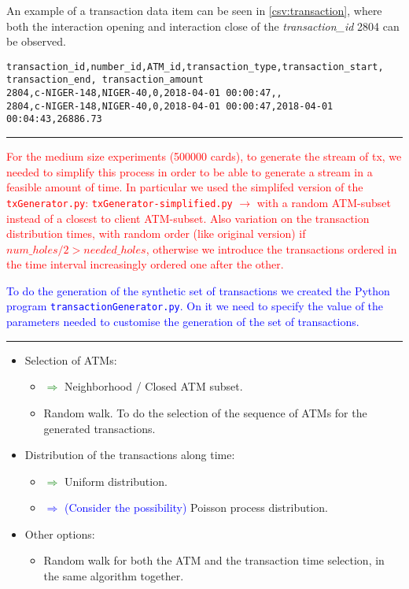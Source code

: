 An example of a transaction data item can be seen in \ref{csv:transaction}, where both the 
interaction opening and interaction close of the \emph{transaction\_id} 2804 can be observed.
\begin{center}
\lstset{style=csvStyle}
\begin{lstlisting}[caption={Example of transaction-all.csv}, label={csv:transaction}]
transaction_id,number_id,ATM_id,transaction_type,transaction_start,
transaction_end, transaction_amount
2804,c-NIGER-148,NIGER-40,0,2018-04-01 00:00:47,,
2804,c-NIGER-148,NIGER-40,0,2018-04-01 00:00:47,2018-04-01 00:04:43,26886.73
\end{lstlisting}
\end{center}

\textcolor{red}{\rule{\linewidth}{0.5mm}}
\textcolor{red}{For the medium size experiments (500000 cards), to generate the stream of tx, we needed to simplify this process in order to be able to generate a stream in a feasible amount of time. In particular we used the simplifed version of the \texttt{txGenerator.py}: \texttt{txGenerator-simplified.py} $\rightarrow$ with a random ATM-subset instead of a closest to client ATM-subset. Also variation on the transaction distribution times, with random order (like original version) if $num\_holes / 2 > needed\_holes$, otherwise we introduce the transactions ordered in the time interval increasingly ordered one after the other.}

\textcolor{blue}{To do the generation of the synthetic set of transactions we created the Python program \texttt{transactionGenerator.py}. On it we need to specify the value of the parameters needed to customise the generation of the set of transactions.}

\textcolor{red}{\rule{\linewidth}{0.5mm}}
\begin{itemize}
  \item Selection of ATMs:
  \begin{itemize}
    \item \textcolor{green}{$\Rightarrow$} Neighborhood / Closed ATM subset.
    \item Random walk. To do the selection of the sequence of ATMs for the generated transactions.
  \end{itemize}
  \item Distribution of the transactions along time:
  \begin{itemize}
    \item \textcolor{green}{$\Rightarrow$} Uniform distribution.
    \item \textcolor{blue}{$\Rightarrow$ (Consider the possibility)} Poisson process distribution.
  \end{itemize}
  \item Other options:
  \begin{itemize}
    \item Random walk for both the ATM and the transaction time selection, in the same algorithm together.
  \end{itemize}
\end{itemize}

